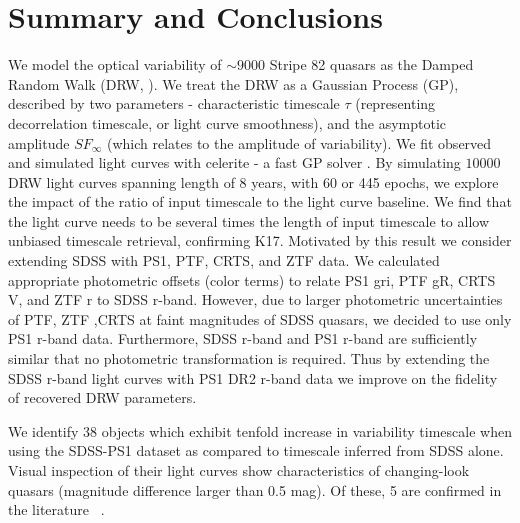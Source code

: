 \documentclass[twocolumn]{aastex62}
\newcommand{\project}[1]{\textsf{#1}}
\begin{document}
%
%
%
%

\section{Summary and Conclusions}
\label{sec:conclusions}
We model the optical variability of ${\sim} 9000$ Stripe 82 quasars as the Damped Random Walk (DRW, \citealt{kelly2009}). We treat the DRW as a Gaussian Process (GP), described by two parameters - characteristic timescale $\tau$ (representing decorrelation timescale, or light curve smoothness), and the asymptotic amplitude $SF_{\infty}$ (which relates to the amplitude of variability). We fit observed and simulated light curves with \project{celerite} - a fast GP solver \citep{foreman2017}. By simulating $10 000$  DRW light curves spanning length of 8 years, with 60 or 445 epochs, we explore the impact of the ratio of input timescale to the light curve baseline. We find that the light curve needs to be several times the length of input timescale to allow unbiased timescale retrieval, confirming K17. Motivated by this result we consider extending SDSS with PS1, PTF, CRTS, and ZTF data.  We calculated appropriate photometric offsets (color terms) to relate PS1 gri, PTF gR,  CRTS V, and ZTF r to SDSS r-band. However, due to larger photometric uncertainties of PTF, ZTF ,CRTS at faint magnitudes of SDSS quasars, we decided to use only PS1 r-band data. Furthermore, SDSS r-band and PS1 r-band are sufficiently similar that no photometric transformation is required.  Thus by extending the SDSS r-band light curves with PS1 DR2 r-band data we improve on the fidelity of recovered DRW parameters. 

We identify 38 objects which exhibit tenfold increase in variability timescale when using the SDSS-PS1 dataset as compared to timescale inferred from SDSS alone. Visual inspection of their light curves show characteristics of changing-look quasars (magnitude difference larger than 0.5 mag). Of these, 5 are confirmed in the literature ~\citep{macleod2019, lamassa2015}. 
\end{document}
